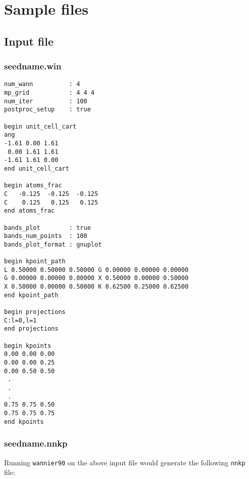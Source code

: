 \chapter{Sample files}

\section{Input file}
\subsection{seedname.win}
\begin{verbatim}
num_wann          : 4 
mp_grid           : 4 4 4 
num_iter          : 100
postproc_setup    : true

begin unit_cell_cart
ang
-1.61 0.00 1.61
 0.00 1.61 1.61
-1.61 1.61 0.00
end unit_cell_cart

begin atoms_frac
C   -0.125  -0.125  -0.125
C    0.125   0.125   0.125
end atoms_frac

bands_plot        : true
bands_num_points  : 100
bands_plot_format : gnuplot

begin kpoint_path
L 0.50000 0.50000 0.50000 G 0.00000 0.00000 0.00000
G 0.00000 0.00000 0.00000 X 0.50000 0.00000 0.50000
X 0.50000 0.00000 0.50000 K 0.62500 0.25000 0.62500
end kpoint_path

begin projections
C:l=0,l=1
end projections

begin kpoints
0.00 0.00 0.00
0.00 0.00 0.25
0.00 0.50 0.50
 .
 .
 .
0.75 0.75 0.50
0.75 0.75 0.75
end kpoints

\end{verbatim}

\subsection{seedname.nnkp}
Running \verb#wannier90# on the above input file would generate the
following \verb#nnkp# file: 

